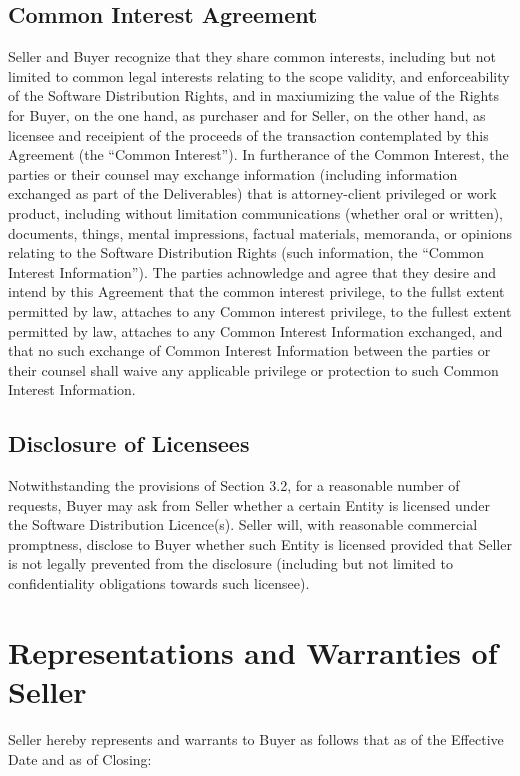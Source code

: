 \documentclass[letterpaper,10pt,english]{sphinxmanual}
\begin{document}
\subsection{Common Interest Agreement}
\label{\detokenize{5-additionalobligations:common-interest-agreement}}
Seller and Buyer recognize that they share common interests, including but not limited to common legal interests relating to the scope validity, and enforceability of the Software Distribution Rights, and in maxiumizing the value of the Rights for Buyer, on the one hand, as purchaser and for Seller, on the other hand, as licensee and receipient of the proceeds of the transaction contemplated by this Agreement (the “Common Interest”). In furtherance of the Common Interest, the parties or their counsel may exchange information (including information exchanged as part of the Deliverables) that is attorney-client privileged or work product, including without limitation communications (whether oral or written), documents, things, mental impressions, factual materials, memoranda, or opinions relating to the Software Distribution Rights (such information, the “Common Interest Information”). The parties achnowledge and agree that they desire and intend by this Agreement that the common interest privilege, to the fullst extent permitted by law, attaches to any Common interest privilege, to the fullest extent permitted by law, attaches to any Common Interest Information exchanged, and that no such exchange of Common Interest Information between the parties or their counsel shall waive any applicable privilege or protection to such Common Interest Information.


\subsection{Disclosure of Licensees}
\label{\detokenize{5-additionalobligations:disclosure-of-licensees}}
Notwithstanding the provisions of Section 3.2, for a reasonable number of requests, Buyer may ask from Seller whether a certain Entity is licensed under the Software Distribution Licence(s). Seller will, with reasonable commercial promptness, disclose to Buyer whether such Entity is licensed provided that Seller is not legally prevented from the disclosure (including but not limited to confidentiality obligations towards such licensee).


\section{Representations and Warranties of Seller}
\label{\detokenize{6-representations:representations-and-warranties-of-seller}}\label{\detokenize{6-representations::doc}}
Seller hereby represents and warrants to Buyer as follows that as of the Effective Date and as of Closing:
\end{document}
